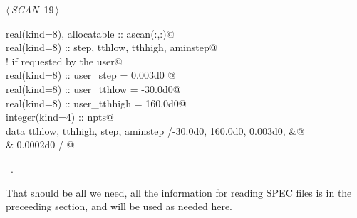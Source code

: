 \documentclass[10pt,a4paper,notitlepage]{article}
\begin{document}
\begin{flushleft} \small
\begin{minipage}{\linewidth}\label{scrap22}\raggedright\small
{} $\langle\,${\it SCAN}\nobreak\ {\footnotesize {19}}$\,\rangle\equiv$
\vspace{-1ex}
\begin{list}{}{} \item
\mbox{}\verb@      real(kind=8), allocatable ::  ascan(:,:)@\\
\mbox{}\verb@      real(kind=8) :: step, tthlow, tthhigh, aminstep@\\
\mbox{}\verb@! if requested by the user@\\
\mbox{}\verb@      real(kind=8) :: user_step = 0.003d0 @\\
\mbox{}\verb@      real(kind=8) :: user_tthlow = -30.0d0@\\
\mbox{}\verb@      real(kind=8) :: user_tthhigh = 160.0d0@\\
\mbox{}\verb@      integer(kind=4) :: npts@\\
\mbox{}\verb@      data tthlow, tthhigh, step, aminstep /-30.0d0, 160.0d0, 0.003d0,  &@\\
\mbox{}\verb@     & 0.0002d0 /                                                            @{\NWsep}
\end{list}
\vspace{-1.5ex}
\footnotesize
\begin{list}{}{\setlength{\itemsep}{-\parsep}\setlength{\itemindent}{-\leftmargin}}
\item \NWtxtMacroRefIn\ .

\item{}
\end{list}
\end{minipage}\vspace{4ex}
\end{flushleft}
That should be all we need, all the information for reading SPEC files is in
the preceeding section, and will be used as needed here.
\end{document}
